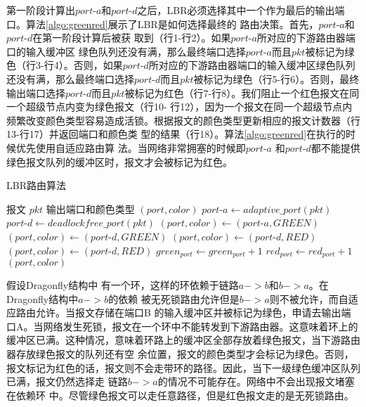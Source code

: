 第一阶段计算出$port\textrm{-}a$和$port\textrm{-}d$之后，LBR必须选择其中一个作为最后的输出端口。算法\ref{algo:greenred}展示了LBR是如何选择最终的
路由决策。首先，$port\textrm{-}a$和$port\textrm{-}d$在第一阶段计算后被获
取到（行1-行2）。如果$port\textrm{-}a$所对应的下游路由器端口的输入缓冲区
绿色队列还没有满，那么最终端口选择$port\textrm{-}a$而且$pkt$被标记为绿色（行3-行4）。否则，如果$port\textrm{-}d$所对应的下游路由器端口的输入缓冲区绿色队列还没有满，那么最终端口选择$port\textrm{-}d$而且$pkt$被标记为绿色（行5-行6）。否则，最终输出端口选择$port\textrm{-}d$而且$pkt$被标记为红色（行7-行8）。我们阻止一个红色报文在同一个超级节点内变为绿色报文（行10- 行12），因为一个报文在同一个超级节点内频繁改变颜色类型容易造成活锁。根据报文的颜色类型更新相应的报文计数器（行13-行17）并返回端口和颜色类
型的结果（行18）。算法\ref{algo:greenred}在执行的时候优先使用自适应路由算
法。当网络非常拥塞的时候即$port\textrm{-}a$ 和$port\textrm{-}d$都不能提供
绿色报文队列的缓冲区时，报文才会被标记为红色。

\begin{algorithm}[t]
  \centering
  \caption{LBR路由算法}
  \label{algo:greenred}
  \begin{algorithmic}[1]
    \REQUIRE 报文 $pkt$
    \ENSURE 输出端口和颜色类型 $(port, color)$
    \STATE $port\textrm{-}a \leftarrow adaptive\_port(pkt)$
    \STATE $port\textrm{-}d \leftarrow deadlockfree\_port(pkt)$
    \STATE $(port, color) \leftarrow (port\textrm{-}a, GREEN)$
    \STATE $(port, color) \leftarrow (port\textrm{-}d, GREEN)$
    \ELSE
    \STATE $(port, color) \leftarrow (port\textrm{-}d, RED)$
    \ENDIF
    \STATE $(port, color) \leftarrow (port\textrm{-}d, RED)$
    \ENDIF
    \STATE $green_{port} \leftarrow green_{port} + 1$
    \ELSE
    \STATE $red_{port} \leftarrow red_{port} + 1$
    \ENDIF
    \RETURN $(port, color)$
  \end{algorithmic}
\end{algorithm}

假设Dragonfly结构中
有一个环，这样的环依赖于链路$a->b$和$b->a$。在Dragonfly结构中$a->b$的依赖
被无死锁路由允许但是$b->a$则不被允许，而自适应路由允许。当报文存储在端口B 的输入缓冲区并被标记为绿色，申请去输出端口A。当网络发生死锁，报文在一个环中不能转发到下游路由器。这意味着环上的缓冲区已满。这种情况，意味着环路上的缓冲区全部存放着绿色报文，当下游路由器存放绿色报文的队列还有空
余位置，报文的颜色类型才会标记为绿色。否则，报文标记为红色的话，报文则不会走带环的路径。因此，当下一级绿色缓冲区队列已满，报文仍然选择走
链路$b->a$的情况不可能存在。网络中不会出现报文堵塞在依赖环
中。尽管绿色报文可以走任意路径，但是红色报文走的是无死锁路由。

